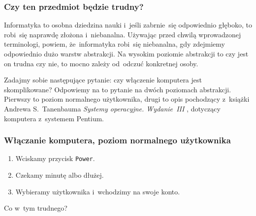 \documentclass[10pt,t]{beamer}
\begin{document}
\begin{frame}
  \frametitle{Czy ten przedmiot będzie trudny?}


  Informatyka to osobna dziedzina nauki i~jeśli zabrnie~się odpowiednio
  głęboko, to robi~się naprawdę złożona i~niebanalna. Używając przed chwilą
  wprowadzonej terminologi, powiem, że~informatyka robi~się niebanalna, gdy
  zdejmiemy odpowiednio dużo warstw abstrakcji. Na wysokim poziomie
  abstrakcji to czy jest on trudna czy nie, to mocno zależy od~odczuć
  konkretnej osoby.

  Zadajmy sobie następujące pytanie: czy włączenie komputera jest
  skomplikowane? Odpowiemy na to pytanie na dwóch poziomach abstrakcji.
  Pierwszy to poziom normalnego użytkownika, drugi to opis pochodzący
  z~książki Andrewa S.~Tanenbauma \textit{Systemy operacyjne. Wydanie~III}
  \parencite{Tannenbaum-Systemy-Operacyjne-Wydanie-III-Pub-2013}, dotyczący
  komputera z~systemem Pentium.

\end{frame}





\begin{frame}
  \frametitle{Włączanie komputera, poziom normalnego użytkownika}


  \begin{enumerate}

  \item Wciskamy przycisk \texttt{Power}.

  \item Czekamy minutę albo dłużej.

  \item Wybieramy użytkownika i~wchodzimy na swoje konto.

  \end{enumerate}



  Co w~tym trudnego?

\end{frame}
\end{document}
